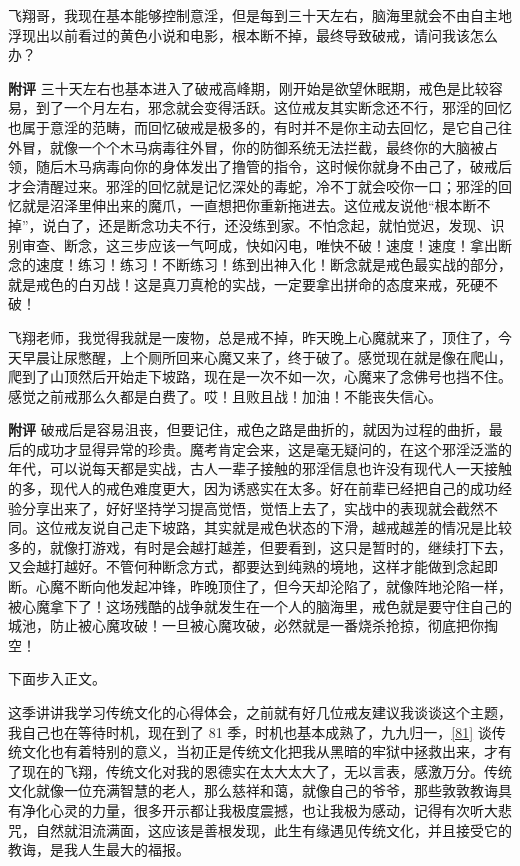 \begin{case}
    飞翔哥，我现在基本能够控制意淫，但是每到三十天左右，脑海里就会不由自主地浮现出以前看过的黄色小说和电影，根本断不掉，最终导致破戒，请问我该怎么办？

    \textbf{附评} 三十天左右也基本进入了破戒高峰期，刚开始是欲望休眠期，戒色是比较容易，到了一个月左右，邪念就会变得活跃。这位戒友其实断念还不行，邪淫的回忆也属于意淫的范畴，而回忆破戒是极多的，有时并不是你主动去回忆，是它自己往外冒，就像一个个木马病毒往外冒，你的防御系统无法拦截，最终你的大脑被占领，随后木马病毒向你的身体发出了撸管的指令，这时候你就身不由己了，破戒后才会清醒过来。邪淫的回忆就是记忆深处的毒蛇，冷不丁就会咬你一口；邪淫的回忆就是沼泽里伸出来的魔爪，一直想把你重新拖进去。这位戒友说他“根本断不掉”，说白了，还是断念功夫不行，还没练到家。不怕念起，就怕觉迟，发现、识别审查、断念，这三步应该一气呵成，快如闪电，唯快不破！速度！速度！拿出断念的速度！练习！练习！不断练习！练到出神入化！断念就是戒色最实战的部分，就是戒色的白刃战！这是真刀真枪的实战，一定要拿出拼命的态度来戒，死硬不破！
\end{case}

\begin{case}
    飞翔老师，我觉得我就是一废物，总是戒不掉，昨天晚上心魔就来了，顶住了，今天早晨让尿憋醒，上个厕所回来心魔又来了，终于破了。感觉现在就是像在爬山，爬到了山顶然后开始走下坡路，现在是一次不如一次，心魔来了念佛号也挡不住。感觉之前戒那么久都是白费了。哎！且败且战！加油！不能丧失信心。

    \textbf{附评} 破戒后是容易沮丧，但要记住，戒色之路是曲折的，就因为过程的曲折，最后的成功才显得异常的珍贵。魔考肯定会来，这是毫无疑问的，在这个邪淫泛滥的年代，可以说每天都是实战，古人一辈子接触的邪淫信息也许没有现代人一天接触的多，现代人的戒色难度更大，因为诱惑实在太多。好在前辈已经把自己的成功经验分享出来了，好好坚持学习提高觉悟，觉悟上去了，实战中的表现就会截然不同。这位戒友说自己走下坡路，其实就是戒色状态的下滑，越戒越差的情况是比较多的，就像打游戏，有时是会越打越差，但要看到，这只是暂时的，继续打下去，又会越打越好。不管何种断念方式，都要达到纯熟的境地，这样才能做到念起即断。心魔不断向他发起冲锋，昨晚顶住了，但今天却沦陷了，就像阵地沦陷一样，被心魔拿下了！这场残酷的战争就发生在一个人的脑海里，戒色就是要守住自己的城池，防止被心魔攻破！一旦被心魔攻破，必然就是一番烧杀抢掠，彻底把你掏空！
\end{case}

下面步入正文。

这季讲讲我学习传统文化的心得体会，之前就有好几位戒友建议我谈谈这个主题，我自己也在等待时机，现在到了 81 季，时机也基本成熟了，九九归一，\ref{81} 谈传统文化也有着特别的意义，当初正是传统文化把我从黑暗的牢狱中拯救出来，才有了现在的飞翔，传统文化对我的恩德实在太大太大了，无以言表，感激万分。传统文化就像一位充满智慧的老人，那么慈祥和蔼，就像自己的爷爷，那些敦敦教诲具有净化心灵的力量，很多开示都让我极度震撼，也让我极为感动，记得有次听大悲咒，自然就泪流满面，这应该是善根发现，此生有缘遇见传统文化，并且接受它的教诲，是我人生最大的福报。

